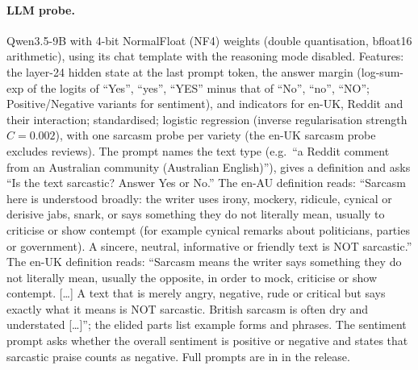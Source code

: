 \documentclass[11pt]{article}
\begin{document}
\paragraph{LLM probe.} Qwen3.5-9B with 4-bit NormalFloat (NF4) weights (double quantisation, bfloat16 arithmetic), using its chat template
with the reasoning mode disabled.
Features: the layer-24 hidden state at the last prompt token, the answer margin (log-sum-exp of the logits of
``Yes'', ``yes'', ``YES'' minus that of ``No'', ``no'', ``NO''; Positive/Negative variants for sentiment), and
indicators for en-UK, Reddit and their interaction; standardised; logistic regression (inverse regularisation strength $C=0.002$), with one sarcasm probe per
variety (the en-UK sarcasm probe excludes reviews). The prompt names the text type (e.g.\ ``a Reddit comment from an Australian community (Australian
English)''), gives a definition and asks ``Is the text sarcastic? Answer Yes or No.'' The en-AU definition reads:
``Sarcasm here is understood broadly: the writer uses irony, mockery, ridicule, cynical or derisive jabs, snark, or
says something they do not literally mean, usually to criticise or show contempt (for example cynical remarks about
politicians, parties or government). A sincere, neutral, informative or friendly text is NOT sarcastic.'' The en-UK
definition reads: ``Sarcasm means the writer says something they do not literally mean, usually the opposite, in order
to mock, criticise or show contempt. [\ldots] A text that is merely angry, negative, rude or critical but says exactly
what it means is NOT sarcastic. British sarcasm is often dry and understated [\ldots]''; the elided parts list example forms and phrases. The sentiment prompt asks whether the overall sentiment is positive or negative and states that
sarcastic praise counts as negative. Full prompts are in  in the release.
\end{document}
